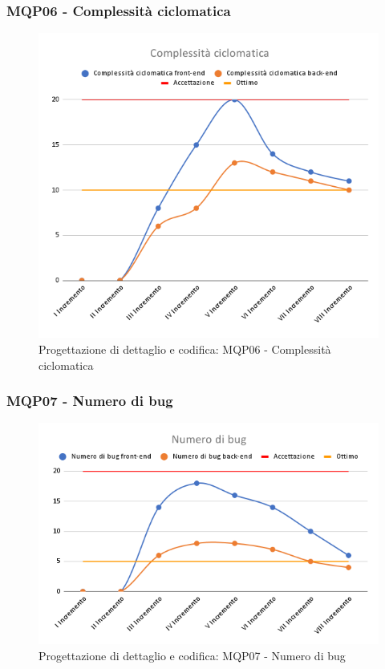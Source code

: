 \subsubsection{MQP06 - Complessità ciclomatica}
\begin{figure}[H]
    \centering
    \includegraphics[scale=0.50]{Sezioni/images/pb_prodotto/Complessita_ciclomatica.png}
    \caption{Progettazione di dettaglio e codifica: MQP06 - Complessità ciclomatica}
\end{figure}
\subsubsection{MQP07 - Numero di bug}
\begin{figure}[H]
    \centering
    \includegraphics[scale=0.50]{Sezioni/images/pb_prodotto/Numero_di_bug.png}
    \caption{Progettazione di dettaglio e codifica: MQP07 - Numero di bug}
\end{figure}
